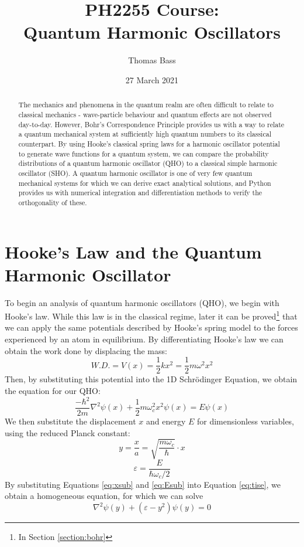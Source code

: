\documentclass[a4paper]{article}
\title{PH2255 Course:\\
Quantum Harmonic Oscillators}
\author{Thomas Bass}
\date{27 March 2021}
\begin{document}
\maketitle

\begin{abstract}
The mechanics and phenomena in the quantum realm are often difficult to relate to classical mechanics - wave-particle behaviour and quantum effects are not observed day-to-day.
However, Bohr's Correspondence Principle provides us with a way to relate a quantum mechanical system at sufficiently high quantum numbers to its classical counterpart.
By using Hooke's classical spring laws for a harmonic oscillator potential to generate wave functions for a quantum system, we can compare the probability distributions of a quantum harmonic oscillator (QHO) to a classical simple harmonic oscillator (SHO).
A quantum harmonic oscillator is one of very few quantum mechanical systems for which we can derive exact analytical solutions, and Python provides us with numerical integration and differentiation methods to verify the orthogonality of these. 
\end{abstract}

\section{Hooke's Law and the Quantum Harmonic Oscillator}
To begin an analysis of quantum harmonic oscillators (QHO), we begin with Hooke's law. While this law is in the classical regime, later it can be proved\footnote{In Section \ref{section:bohr}} that we can apply the same potentials described by Hooke's spring model to the forces experienced by an atom in equilibrium. By differentiating Hooke's law we can obtain the work done by displacing the mass:
\begin{equation} \label{eq:hooke}
W.D.=V(x)=\frac12kx^2=\frac12m\omega^2x^2
\end{equation}
Then, by substituting this potential into the 1D Schr\"odinger Equation, we obtain the equation for our QHO:
\begin{equation} \label{eq:tise}
\frac{-\hbar^2}{2m}\nabla^2\psi(x) + \frac12m\omega^2_cx^2\psi(x)=E\psi(x)
\end{equation}
We then substitute the displacement $x$ and energy $E$ for dimensionless variables, using the reduced Planck constant:
\begin{equation} \label{eq:xsub}
y=\frac xa=\sqrt{\frac{m\omega_c}\hbar}\cdot x
\end{equation}
\begin{equation} \label{eq:Esub}
\varepsilon=\frac E{\hbar\omega_c/2}
\end{equation}
By substituting Equations \ref{eq:xsub} and \ref{eq:Esub} into Equation \ref{eq:tise}, we obtain a homogeneous equation, for which we can solve
\begin{equation} \label{eq:tise_hom}
\nabla^2\psi(y)+(\varepsilon-y^2)\psi(y)=0
\end{equation} 
\newpage
\end{document}
